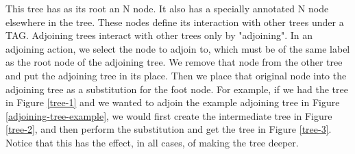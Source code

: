 This tree has as its root an N node.  It also has a specially annotated N node elsewhere in the
tree.  These nodes define its interaction with other trees under a TAG.  Adjoining trees interact
with other trees only by "adjoining".  In an adjoining action, we select the node
to adjoin to, which must be of the same label as the root node of the adjoining tree.  We remove
that node from the other tree and put the adjoining tree in its place.  Then
we place that original node into the adjoining tree as a substitution for the foot node.
For example, if we had the tree in Figure \ref{tree-1} and we wanted to adjoin the example adjoining tree
in Figure \ref{adjoining-tree-example}, we would first create the intermediate tree in Figure \ref{tree-2},
and then perform the substitution and get the tree in Figure \ref{tree-3}.  Notice that this has the effect,
in all cases, of making the tree deeper.

